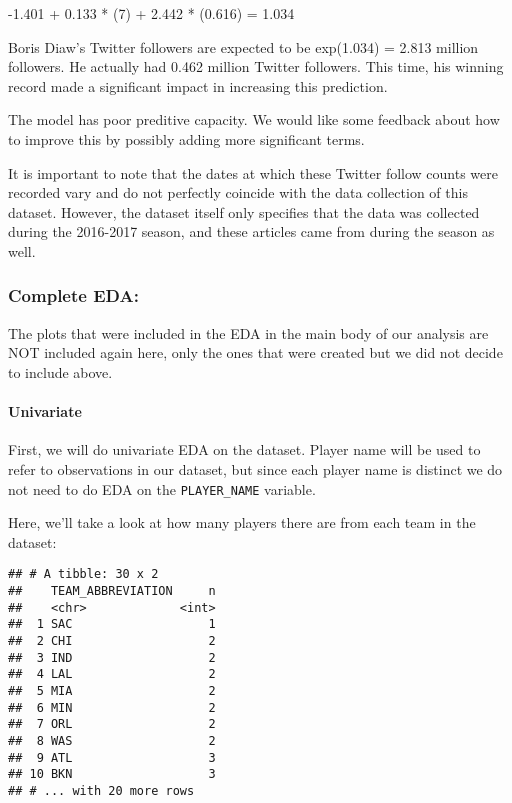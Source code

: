 \documentclass[]{article}
\newenvironment{Shaded}{\begin{snugshade}}{\end{snugshade}}
\newcommand{\KeywordTok}[1]{\textcolor[rgb]{0.13,0.29,0.53}{\textbf{#1}}}
\newcommand{\NormalTok}[1]{#1}
\newcommand{\OperatorTok}[1]{\textcolor[rgb]{0.81,0.36,0.00}{\textbf{#1}}}
\newcommand{\StringTok}[1]{\textcolor[rgb]{0.31,0.60,0.02}{#1}}
\let\oldparagraph\paragraph
\renewcommand{\paragraph}[1]{\oldparagraph{#1}\mbox{}}
\begin{document}
-1.401 + 0.133 * (7) + 2.442 * (0.616) = 1.034

Boris Diaw's Twitter followers are expected to be exp(1.034) = 2.813
million followers. He actually had 0.462 million Twitter followers. This
time, his winning record made a significant impact in increasing this
prediction.

The model has poor preditive capacity. We would like some feedback about
how to improve this by possibly adding more significant terms.

It is important to note that the dates at which these Twitter follow
counts were recorded vary and do not perfectly coincide with the data
collection of this dataset. However, the dataset itself only specifies
that the data was collected during the 2016-2017 season, and these
articles came from during the season as well.

\hypertarget{complete-eda}{%
\subsubsection{Complete EDA:}\label{complete-eda}}

The plots that were included in the EDA in the main body of our analysis
are NOT included again here, only the ones that were created but we did
not decide to include above.

\hypertarget{univariate-1}{%
\paragraph{Univariate}\label{univariate-1}}

First, we will do univariate EDA on the dataset. Player name will be
used to refer to observations in our dataset, but since each player name
is distinct we do not need to do EDA on the \texttt{PLAYER\_NAME}
variable.

Here, we'll take a look at how many players there are from each team in
the dataset:

\begin{Shaded}
\end{Shaded}

\begin{verbatim}
## # A tibble: 30 x 2
##    TEAM_ABBREVIATION     n
##    <chr>             <int>
##  1 SAC                   1
##  2 CHI                   2
##  3 IND                   2
##  4 LAL                   2
##  5 MIA                   2
##  6 MIN                   2
##  7 ORL                   2
##  8 WAS                   2
##  9 ATL                   3
## 10 BKN                   3
## # ... with 20 more rows
\end{verbatim}
\end{document}

